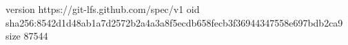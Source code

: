 version https://git-lfs.github.com/spec/v1
oid sha256:8542d1d48ab1a7d2572b2a4a3a8f5ecdb658fecb3f36944347558e697bdb2ca9
size 87544
